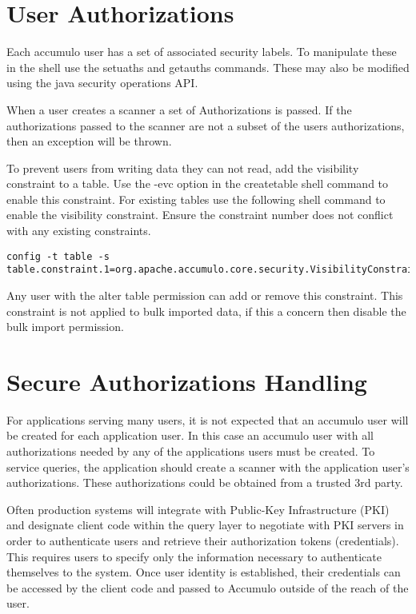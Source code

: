 \section{User Authorizations}

Each accumulo user has a set of associated security labels.  To manipulate
these in the shell use the setuaths and getauths commands.  These may also be
modified using the java security operations API.   

When a user creates a scanner a set of Authorizations is passed.  If the
authorizations passed to the scanner are not a subset of the users
authorizations, then an exception will be thrown.

To prevent users from writing data they can not read, add the visibility
constraint to a table.  Use the -evc option in the createtable shell command to
enable this constraint.  For existing tables use the following shell command to
enable the visibility constraint.  Ensure the constraint number does not
conflict with any existing constraints.
  
\small
\begin{verbatim}
config -t table -s table.constraint.1=org.apache.accumulo.core.security.VisibilityConstraint
\end{verbatim}
\normalsize

Any user with the alter table permission can add or remove this constraint.
This constraint is not applied to bulk imported data, if this a concern then
disable the bulk import permission.

\section{Secure Authorizations Handling}

For applications serving many users, it is not expected that an accumulo user
will be created for each application user.  In this case an accumulo user with
all authorizations needed by any of the applications users must be created.  To
service queries, the application should create a scanner with the application
user's authorizations.  These authorizations could be obtained from a trusted 3rd
party.

Often production systems will integrate with Public-Key Infrastructure (PKI) and
designate client code within the query layer to negotiate with PKI servers in order
to authenticate users and retrieve their authorization tokens (credentials). This
requires users to specify only the information necessary to authenticate themselves
to the system. Once user identity is established, their credentials can be accessed by
the client code and passed to Accumulo outside of the reach of the user.

